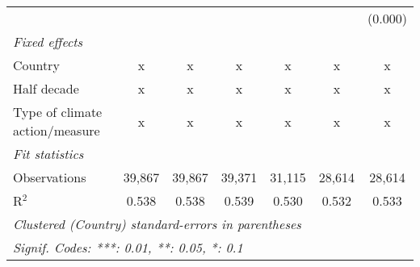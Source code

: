 \begin{tabular}{lcccccc}
                                                              &         &               &               &               &               & (0.000)\\   
   \emph{Fixed effects}\\
   Country                                                    & x       & x             & x             & x             & x             & x\\  
   Half decade                                                & x       & x             & x             & x             & x             & x\\  
   Type of climate action/measure                             & x       & x             & x             & x             & x             & x\\  
   \midrule \emph{Fit statistics}\\
   Observations                                               & 39,867  & 39,867        & 39,371        & 31,115        & 28,614        & 28,614\\  
   R$^2$                                                      & 0.538   & 0.538         & 0.539         & 0.530         & 0.532         & 0.533\\  
   \midrule
   \multicolumn{7}{l}{\emph{Clustered (Country) standard-errors in parentheses}}\\
   \multicolumn{7}{l}{\emph{Signif. Codes: ***: 0.01, **: 0.05, *: 0.1}}\\
\end{tabular}
\par\endgroup


